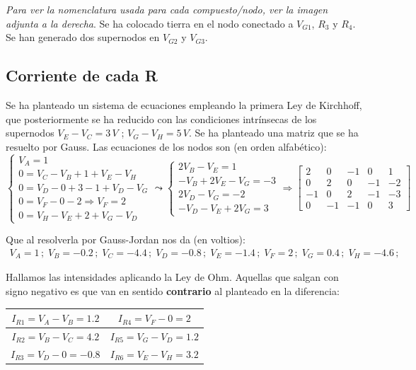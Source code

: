 \documentclass[]{scrartcl}
\begin{document}
\textit{Para ver la nomenclatura usada para cada compuesto/nodo, ver la imagen adjunta a la derecha}. Se ha colocado tierra en el nodo conectado a $V_{G1}$, $R_3$ y $R_4$. Se han generado dos supernodos en $V_{G2}$ y $V_{G3}$.

\subsection{Corriente de cada R}

Se ha planteado un sistema de ecuaciones empleando la primera Ley de Kirchhoff, que posteriormente se ha reducido con las condiciones intrínsecas de los supernodos $V_E - V_C = 3\, V$ ; $V_G-V_H=5\, V$. Se ha planteado una matriz que se ha resuelto por Gauss. Las ecuaciones de los nodos son (en orden alfabético): \clearpage
\begin{equation*}
	\left\{
	\begin{array}{l}
		V_A=1\\
		0=V_C-V_B+1+V_E-V_H\\
		0=V_D-0+3-1+V_D-V_G\\
		0=V_F-0-2 \Rightarrow V_F=2\\
		0=V_H -V_E+2+V_G-V_D
	\end{array}
	\right. \leadsto \left\{
	\begin{array}{l}
		2V_B-V_E=1\\
		-V_B+2V_E-V_G=-3\\
		2V_D-V_G=-2\\
		-V_D-V_E+2V_G=3
	\end{array}
	\right.\Rightarrow \left[
	\begin{array}{cccc|c}
		2&0&-1&0&1\\0&2&0&-1&-2\\-1&0&2&-1&-3\\0&-1&-1&0&3
	\end{array}
	\right]
\end{equation*}

Que al resolverla por Gauss-Jordan nos da (en voltios):
\begin{gather*}
	V_A=1\, ;\; V_B=-0.2\, ;\; V_C=-4.4\, ;\; V_D=-0.8\, ;\; V_E=-1.4\, ;\; V_F=2\, ;\; V_G=0.4\, ;\; V_H=-4.6\, ;\; 
\end{gather*}

Hallamos las intensidades aplicando la Ley de Ohm. Aquellas que salgan con signo negativo es que van en sentido \textbf{contrario} al planteado en la diferencia:
\begin{table}[H]
\centering
\begin{tabular}{|c|c|}  \hline
$I_{R1}=V_A-V_B=1.2$ & $I_{R4}=V_F-0=2$ \\ \hline
$I_{R2}=V_B-V_C=4.2$ & $I_{R5}=V_G-V_D=1.2$ \\ \hline
$I_{R3}=V_D-0=-0.8$ & $I_{R6}=V_E-V_H=3.2$ \\ \hline
\end{tabular}
\end{table}
\end{document}
